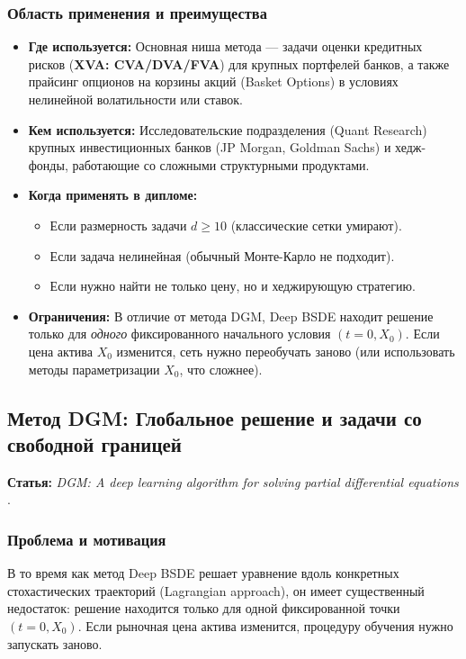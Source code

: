 \documentclass[12pt, a4paper]{article}
\begin{document}
\subsubsection{Область применения и преимущества}
\begin{itemize}
    \item \textbf{Где используется:} Основная ниша метода — задачи оценки кредитных рисков (\textbf{XVA: CVA/DVA/FVA}) для крупных портфелей банков, а также прайсинг опционов на корзины акций (Basket Options) в условиях нелинейной волатильности или ставок.
    \item \textbf{Кем используется:} Исследовательские подразделения (Quant Research) крупных инвестиционных банков (JP Morgan, Goldman Sachs) и хедж-фонды, работающие со сложными структурными продуктами.
    \item \textbf{Когда применять в дипломе:}
    \begin{itemize}
        \item Если размерность задачи $d \ge 10$ (классические сетки умирают).
        \item Если задача нелинейная (обычный Монте-Карло не подходит).
        \item Если нужно найти не только цену, но и хеджирующую стратегию.
    \end{itemize}
    \item \textbf{Ограничения:} В отличие от метода DGM, Deep BSDE находит решение только для \textit{одного} фиксированного начального условия $(t=0, X_0)$. Если цена актива $X_0$ изменится, сеть нужно переобучать заново (или использовать методы параметризации $X_0$, что сложнее).
\end{itemize}

\subsection{Метод DGM: Глобальное решение и задачи со свободной границей}
\textbf{Статья:} \textit{DGM: A deep learning algorithm for solving partial differential equations} \cite{Sirignano2018}.

\subsubsection{Проблема и мотивация}
В то время как метод Deep BSDE решает уравнение вдоль конкретных стохастических траекторий (Lagrangian approach), он имеет существенный недостаток: решение находится только для одной фиксированной точки $(t=0, X_0)$. Если рыночная цена актива изменится, процедуру обучения нужно запускать заново.
\end{document}
